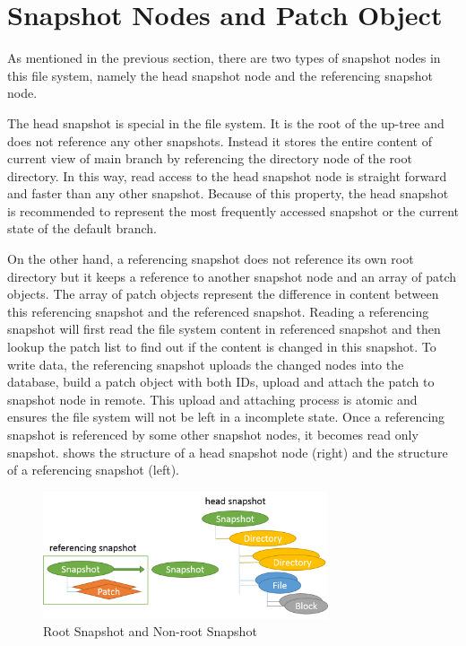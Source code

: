 \section{Snapshot Nodes and Patch Object}

    As mentioned in the previous section, there are two types of snapshot nodes in this file system, namely the head snapshot node and the referencing snapshot node.

    The head snapshot is special in the file system. It is the root of the up-tree and does not reference any other snapshots. Instead it stores the entire content of current view of main branch by referencing the directory node of the root directory. In this way, read access to the head snapshot node is straight forward and faster than any other snapshot. Because of this property, the head snapshot is recommended to represent the most frequently accessed snapshot or the current state of the default branch.

    On the other hand, a referencing snapshot does not reference its own root directory but it keeps a reference to another snapshot node and an array of patch objects. The array of patch objects represent the difference in content between this referencing snapshot and the referenced snapshot. Reading a referencing snapshot will first read the file system content in referenced snapshot and then lookup the patch list to find out if the content is changed in this snapshot. To write data, the referencing snapshot uploads the changed nodes into the database, build a patch object with both IDs, upload and attach the patch to snapshot node in remote. This upload and attaching process is atomic and ensures the file system will not be left in a incomplete state. Once a referencing snapshot is referenced by some other snapshot nodes, it becomes read only snapshot.  shows the structure of a head snapshot node (right) and the structure of a referencing snapshot (left).
    
\begin{figure}[t]
\centering
\includegraphics[width=0.75\textwidth]{Chapter-4/figs/fig12.png}
\caption{Root Snapshot and Non-root Snapshot}
\label{fig:root_and_nonroot}
\end{figure}

